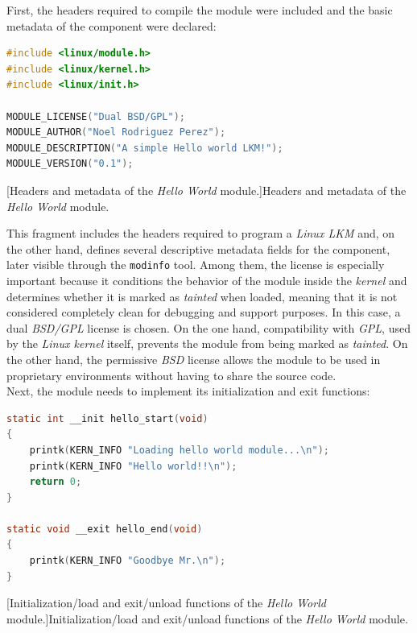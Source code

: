 First, the headers required to compile the module were included and the basic metadata of the component were declared:\\

\begin{lstlisting}[language=C]
#include <linux/module.h>
#include <linux/kernel.h>
#include <linux/init.h>

MODULE_LICENSE("Dual BSD/GPL");
MODULE_AUTHOR("Noel Rodriguez Perez");
MODULE_DESCRIPTION("A simple Hello world LKM!");
MODULE_VERSION("0.1");
\end{lstlisting}
\captionsetup{type=code,justification=centering,singlelinecheck=false}
[Headers and metadata of the \textit{Hello World} module.]{Headers and metadata of the \textit{Hello World} module.}
\label{cod:hello_headers}
\vspace{\baselineskip}

This fragment includes the headers required to program a \textit{Linux LKM} and, on the other hand, defines several descriptive metadata fields for the component, later visible through the \texttt{modinfo} tool.
Among them, the license is especially important because it conditions the behavior of the module inside the \textit{kernel} and determines whether it is marked as \textit{tainted} when loaded, meaning that it is not considered completely clean for debugging and support purposes.
In this case, a dual \textit{BSD/GPL} license is chosen.
On the one hand, compatibility with \textit{GPL}, used by the \textit{Linux kernel} itself, prevents the module from being marked as \textit{tainted}.
On the other hand, the permissive \textit{BSD} license allows the module to be used in proprietary environments without having to share the source code.\\

Next, the module needs to implement its initialization and exit functions:

\begin{lstlisting}[language=C]
static int __init hello_start(void)
{
    printk(KERN_INFO "Loading hello world module...\n");
    printk(KERN_INFO "Hello world!!\n");
    return 0;
}

static void __exit hello_end(void)
{
    printk(KERN_INFO "Goodbye Mr.\n");
}
\end{lstlisting}
\captionsetup{type=code,justification=centering,singlelinecheck=false}
[Initialization/load and exit/unload functions of the \textit{Hello World} module.]{Initialization/load and exit/unload functions of the \textit{Hello World} module.}
\label{cod:hello_init_exit}
\vspace{\baselineskip}

